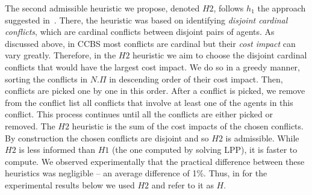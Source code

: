 \documentclass[letterpaper]{article} %
\newcommand{\ccbs}{\ac{CCBS}\xspace}
\begin{document}

The second admissible heuristic we propose, denoted $H2$, follows $h_1$ the approach suggested in~\cite{felner2018adding}. 
There, the heuristic was based on identifying \emph{disjoint cardinal conflicts}, which are cardinal conflicts between disjoint pairs of agents. 
As discussed above, in \ccbs most conflicts are cardinal but their \emph{cost impact} can vary greatly. 
Therefore, in the $H2$ heuristic we aim to choose the disjoint cardinal conflicts that would have the largest cost impact. We do so in a greedy manner, sorting the conflicts in $N.\Pi$ in descending order of their cost impact. Then, conflicts are picked one by one in this order. 
After a conflict is picked, we remove from the conflict list all conflicts that involve at least one of the agents in this conflict. This process continues until all the conflicts are either picked or removed. 
The $H2$ heuristic is the sum of the cost impacts of the chosen conflicts. 
By construction the chosen conflicts are disjoint and so $H2$ is admissible. 
While $H2$ is less informed than $H1$ (the one computed by solving LPP), it is faster to compute. 
We observed experimentally that the practical difference between these heuristics was negligible -- an average difference of 1\%. 
Thus, in for the experimental results below we used $H2$ and refer to it as $H$. 

\end{document}
